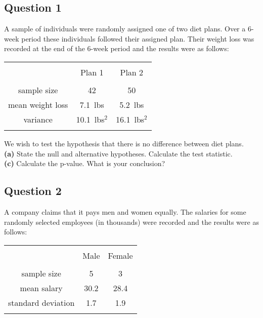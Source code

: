 \documentclass[12pt]{article}
\begin{document}
\subsection*{Question 1}
A sample of individuals were randomly assigned one of two diet plans. Over a 6-week period these individuals followed their assigned plan. Their weight loss was recorded at the end of the 6-week period and the results were as follows: \\[-0.2cm]
\begin{center}
\begin{tabular}{|c|c|c|}
\hline
&&\\[-0.4cm]
& Plan 1 & Plan 2 \\
\hline
&&\\[-0.4cm]
sample size & 42 & 50 \\
mean weight loss & 7.1\,\,\,lbs & 5.2\,\,\,lbs \\
variance & 10.1\,\,\,lbs$^2$ & 16.1\,\,\,lbs$^2$ \\
\hline
\multicolumn{3}{c}{}\\[-0.3cm]
\end{tabular}
\end{center}

We wish to test the hypothesis that there is no difference between diet plans.\\[0.2cm]
{\bf(a)} State the null and alternative hypotheses.  Calculate the test statistic. \quad \\{\bf(c)} Calculate the p-value.  What is your conclusion?


\subsection*{Question 2}
A company claims that it pays men and women equally. The salaries for some randomly selected employees (in thousands) were recorded and the results were as follows:\\[-0.2cm]
\begin{center}
\begin{tabular}{|c|c|c|}
\hline
&&\\[-0.4cm]
& Male & Female \\
\hline
&&\\[-0.4cm]
sample size & 5 & 3 \\
mean salary & 30.2 & 28.4 \\
standard deviation & 1.7 & 1.9 \\
\hline
\multicolumn{3}{c}{}\\[-0.3cm]
\end{tabular}
\end{center}
\end{document}
